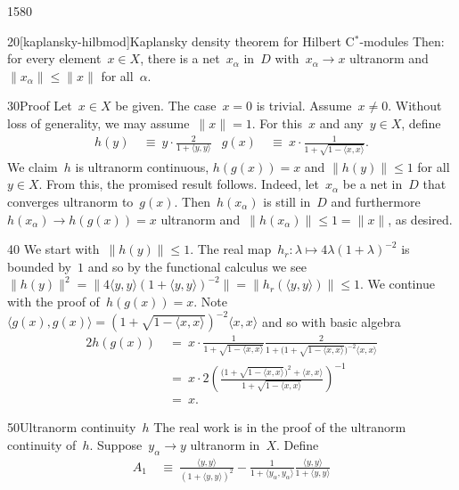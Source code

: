 \begin{parsec}{1580}
\begin{point}{20}[kaplansky-hilbmod]{Kaplansky density theorem for Hilbert C$^*$-modules}
Then: for every element~$x \in X$,
    there is a net~$x_\alpha$ in~$D$
    with~$x_\alpha \to x$ ultranorm
    and~$\|x_\alpha\| \leq \|x\|$ for all~$\alpha$.
\begin{point}{30}{Proof}%
Let~$x \in X$ be given.
The case~$x=0$ is trivial.
Assume~$x \neq 0$.
Without loss of generality, we may assume~$\| x \| = 1$.
For this~$x$ and any~$y \in X$, define
\begin{align*}
    h(y) &\ \equiv \ y \cdot\frac{2}{1+ \langle y, y \rangle}
    &
    g(x) &\ \equiv \ x \cdot\frac{1}{1+ \sqrt{1- \langle x, x\rangle}}.
\end{align*}
We claim~$h$ is ultranorm continuous,
$h(g(x)) = x$ and $\| h(y) \| \leq 1$ for all~$y \in X$.
From this, the promised result follows.
Indeed, let~$x_\alpha$ be a net in~$D$
    that converges ultranorm to~$g(x)$.
Then~$h(x_\alpha)$ is
    still in~$D$
    and furthermore~$h(x_\alpha) \to h(g(x)) = x$ ultranorm
    and~$\| h(x_\alpha) \| \leq 1 = \| x \|$, as desired.
\begin{point}{40}%
We start with~$\| h(y) \| \leq 1$.
The real map~$h_r\colon \lambda \mapsto 4 \lambda (1+\lambda)^{-2}$
    is bounded by~$1$ and so by the functional calculus
    we see~$\| h(y) \|^2 = \| 4 \langle y,y\rangle (1+ \langle y,y\rangle)^{-2} \|
                = \| h_r(\langle y,y\rangle) \|  \leq 1$.
We continue with the proof of~$h(g(x)) = x$.
Note~$\langle g(x), g(x) \rangle
= (1 + \sqrt{1 - \langle x,x \rangle })^{-2} \langle x,x\rangle$
and so with basic algebra
\begin{alignat*}{2}
    h(g(x)) &\ = \ x \cdot
\frac{1}{ 1 + \sqrt{1 - \langle x,x\rangle }}
\frac{2}{1 + \bigl(1 + \sqrt{1 - \langle x,x \rangle }\bigr)^{-2} \langle x,x\rangle} \\
& \ =\  x \cdot 2 \left( \frac{
    \bigl(1 + \sqrt{1-\langle x, x\rangle}\bigr)^2 + \langle x,x \rangle
}{1 + \sqrt{1 - \langle x,x \rangle}} \right)^{-1} \\
& \ = \ x.
\end{alignat*}
\end{point}
\begin{point}{50}{Ultranorm continuity~$h$}%
The real work is in the proof of the ultranorm continuity of~$h$.
Suppose~$y_\alpha \to y$ ultranorm in~$X$. Define
\begin{align*}
    A_1 & \ \equiv \ \frac{\langle y,y\rangle}{(1 + \langle y,y \rangle)^2} 
            - \frac{1}{1+\langle y_\alpha,y_\alpha \rangle} \frac{\langle y,y \rangle}{1+\langle y,y \rangle} \\

\end{align*}
\end{point}
\end{point}
\end{point}
\end{parsec}

